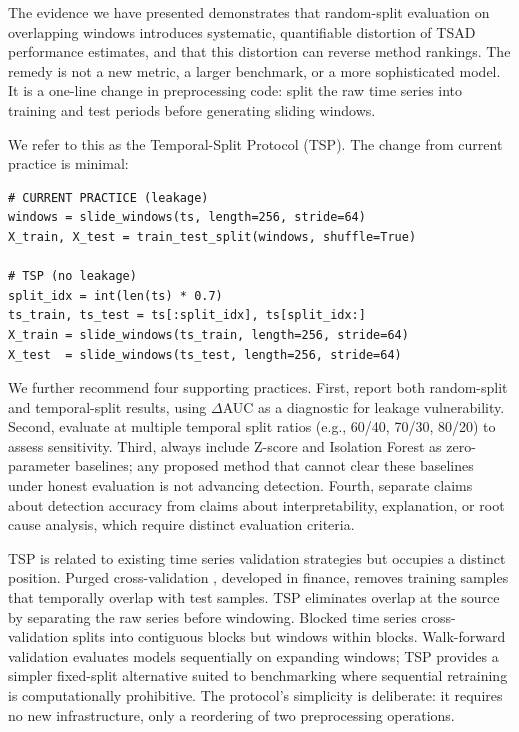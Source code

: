 \documentclass[preprint,12pt]{elsarticle}
\begin{document}
The evidence we have presented demonstrates that random-split evaluation on overlapping windows introduces systematic, quantifiable distortion of TSAD performance estimates, and that this distortion can reverse method rankings. The remedy is not a new metric, a larger benchmark, or a more sophisticated model. It is a one-line change in preprocessing code: split the raw time series into training and test periods before generating sliding windows.

We refer to this as the Temporal-Split Protocol (TSP). The change from current practice is minimal:

\begin{verbatim}
# CURRENT PRACTICE (leakage)
windows = slide_windows(ts, length=256, stride=64)
X_train, X_test = train_test_split(windows, shuffle=True)

# TSP (no leakage)
split_idx = int(len(ts) * 0.7)
ts_train, ts_test = ts[:split_idx], ts[split_idx:]
X_train = slide_windows(ts_train, length=256, stride=64)
X_test  = slide_windows(ts_test, length=256, stride=64)
\end{verbatim}

We further recommend four supporting practices. First, report both random-split and temporal-split results, using $\Delta$AUC as a diagnostic for leakage vulnerability. Second, evaluate at multiple temporal split ratios (e.g., 60/40, 70/30, 80/20) to assess sensitivity. Third, always include Z-score and Isolation Forest as zero-parameter baselines; any proposed method that cannot clear these baselines under honest evaluation is not advancing detection. Fourth, separate claims about detection accuracy from claims about interpretability, explanation, or root cause analysis, which require distinct evaluation criteria.

TSP is related to existing time series validation strategies but occupies a distinct position. Purged cross-validation \cite{deprado2018advances}, developed in finance, removes training samples that temporally overlap with test samples. TSP eliminates overlap at the source by separating the raw series before windowing. Blocked time series cross-validation \cite{bergmeir2012use} splits into contiguous blocks but windows within blocks. Walk-forward validation evaluates models sequentially on expanding windows; TSP provides a simpler fixed-split alternative suited to benchmarking where sequential retraining is computationally prohibitive. The protocol's simplicity is deliberate: it requires no new infrastructure, only a reordering of two preprocessing operations.
\end{document}
